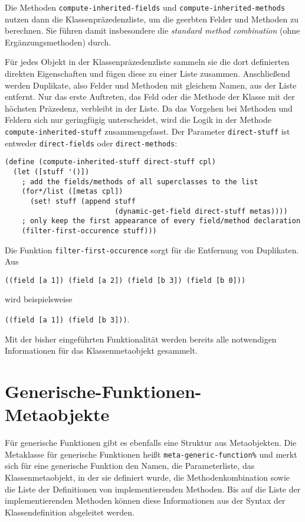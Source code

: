 Die Methoden \texttt{compute-inherited-fields} und \texttt{compute-inherited-methods} nutzen dann die Klassenpräzedenzliste, um die geerbten Felder und Methoden zu berechnen. Sie führen damit insbesondere die \textit{standard method combination} (ohne Ergänzungsmethoden) durch.

Für jedes Objekt in der Klassenpräzedenzliste sammeln sie die dort definierten direkten Eigenschaften und fügen diese zu einer Liste zusammen. Anschließend werden Duplikate, also Felder und Methoden mit gleichem Namen, aus der Liste entfernt. Nur das erste Auftreten, das Feld oder die Methode der Klasse mit der höchsten Präzedenz, verbleibt in der Liste. Da das Vorgehen bei Methoden und Feldern sich nur geringfügig unterscheidet, wird die Logik in der Methode \texttt{compute-inherited-stuff} zusammengefasst. Der Parameter \texttt{direct-stuff} ist entweder \texttt{{\textquotesingle}direct-fields} oder \texttt{{\textquotesingle}direct-methods}:
\newpage
\begin{lstlisting}
(define (compute-inherited-stuff direct-stuff cpl)
  (let ([stuff '()])
    ; add the fields/methods of all superclasses to the list
    (for*/list ([metas cpl])
      (set! stuff (append stuff 
                          (dynamic-get-field direct-stuff metas))))
    ; only keep the first appearance of every field/method declaration
    (filter-first-occurence stuff)))
\end{lstlisting}

Die Funktion \texttt{filter-first-occurence} sorgt für die Entfernung von Duplikaten. Aus

\texttt{\textquotesingle((field [a 1]) (field [a 2]) (field [b 3]) (field [b 0]))}

wird beispielsweise

\texttt{\textquotesingle((field [a 1]) (field [b 3]))}.

Mit der bisher eingeführten Funktionalität werden bereits alle notwendigen Informationen für das Klassenmetaobjekt gesammelt.

\section{Generische-Funktionen-Metaobjekte}
Für generische Funktionen gibt es ebenfalls eine Struktur aus Metaobjekten. Die Metaklasse für generische Funktionen heißt \texttt{meta-generic-function\%} und merkt sich für eine generische Funktion den Namen, die Parameterliste, das Klassenmetaobjekt, in der sie definiert wurde, die Methodenkombination sowie die Liste der Definitionen von implementierenden Methoden. Bis auf die Liste der implementierenden Methoden können diese Informationen aus der Syntax der Klassendefinition abgeleitet werden.

